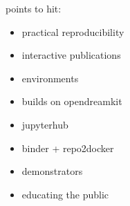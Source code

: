 points to hit:

\begin{itemize}
    \item practical reproducibility
    \item interactive publications
    \item environments
    \item builds on opendreamkit
    \item jupyterhub
    \item binder + repo2docker
    \item demonstrators
    \item educating the public
\end{itemize}



